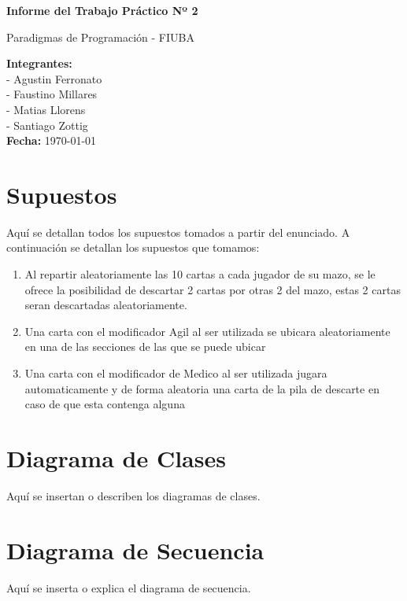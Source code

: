 \documentclass[a4paper,12pt]{article}
\begin{document}
\begin{titlepage}
    \centering
    \vspace*{5cm}

    {\Huge \textbf{Informe del Trabajo Práctico Nº 2}\\[1.5cm]}

    {\Large Paradigmas de Programación - FIUBA \\[1.5cm]}

    \textbf{Integrantes:} \\[0.5cm]
    - Agustin Ferronato\\
    - Faustino Millares \\
    - Matias Llorens \\
    - Santiago Zottig \\[2cm]

    \vfill
    \textbf{Fecha:} \today

\end{titlepage}

\tableofcontents
\newpage

\section{Supuestos}
Aquí se detallan todos los supuestos tomados a partir del enunciado.
A continuación se detallan los supuestos que tomamos:

\begin{enumerate}
    \item Al repartir aleatoriamente las 10 cartas a cada jugador
     de su mazo, se le ofrece la posibilidad de descartar 2
     cartas por otras 2 del mazo, estas 2 cartas seran 
     descartadas aleatoriamente.
    \item Una carta con el modificador Agil al ser utilizada
    se ubicara aleatoriamente en una de las secciones de las 
    que se puede ubicar
    \item Una carta con el modificador de Medico al ser utilizada
    jugara automaticamente y de forma aleatoria una carta de la
    pila de descarte en caso de que esta contenga alguna
\end{enumerate}

\section{Diagrama de Clases}
Aquí se insertan o describen los diagramas de clases.

\section{Diagrama de Secuencia}
Aquí se inserta o explica el diagrama de secuencia.
\end{document}
